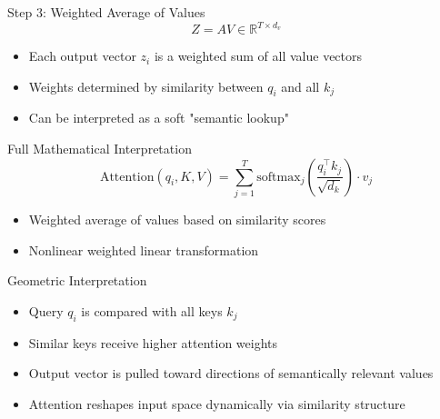 \documentclass{beamer}
\begin{document}
	\begin{frame}{Step 3: Weighted Average of Values}
		\[
		Z = AV \in \mathbb{R}^{T \times d_v}
		\]
		\begin{itemize}
			\item Each output vector \( z_i \) is a weighted sum of all value vectors
			\item Weights determined by similarity between \( q_i \) and all \( k_j \)
			\item Can be interpreted as a soft "semantic lookup"
		\end{itemize}
	\end{frame}
	
	\begin{frame}{Full Mathematical Interpretation}
		\[
		\boxed{
			\text{Attention}(q_i, K, V) = \sum_{j=1}^T \mathrm{softmax}_j\left( \frac{q_i^\top k_j}{\sqrt{d_k}} \right) \cdot v_j
		}
		\]
		\begin{itemize}
			\item Weighted average of values based on similarity scores
			\item Nonlinear weighted linear transformation
		\end{itemize}
	\end{frame}
	
	\begin{frame}{Geometric Interpretation}
		\begin{itemize}
			\item Query \( q_i \) is compared with all keys \( k_j \)
			\item Similar keys receive higher attention weights
			\item Output vector is pulled toward directions of semantically relevant values
			\item Attention reshapes input space dynamically via similarity structure
		\end{itemize}
	\end{frame}
	
\end{document}
